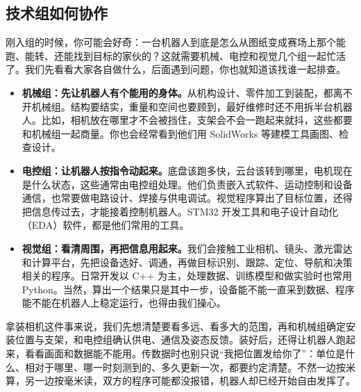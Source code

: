 \begingroup
\makeatletter
{}
\makeatother

\subsection*{技术组如何协作}
刚入组的时候，你可能会好奇：一台机器人到底是怎么从图纸变成赛场上那个能跑、能转、还能找到目标的家伙的？这就需要机械、电控和视觉几个组一起忙活了。我们先看看大家各自做什么，后面遇到问题，你也就知道该找谁一起排查。

\begin{itemize}
    \item \textbf{机械组：先让机器人有个能用的身体。}从机构设计、零件加工到装配，都离不开机械组。结构要结实，重量和空间也要顾到，最好维修时还不用拆半台机器人。比如，相机放在哪里才不会被挡住，支架会不会一跑起来就抖，这些都要和机械组一起商量。你也会经常看到他们用 SolidWorks 等建模工具画图、检查设计。
    \item \textbf{电控组：让机器人按指令动起来。}底盘该跑多快，云台该转到哪里，电机现在是什么状态，这些通常由电控组处理。他们负责嵌入式软件、运动控制和设备通信，也常要做电路设计、焊接与供电调试。视觉程序算出了目标位置，还得把信息传过去，才能接着控制机器人。STM32 开发工具和电子设计自动化（EDA）软件，都是他们常用的工具。
    \item \textbf{视觉组：看清周围，再把信息用起来。}我们会接触工业相机、镜头、激光雷达和计算平台，先把设备选好、调通，再做目标识别、跟踪、定位、导航和决策相关的程序。日常开发以 C++ 为主，处理数据、训练模型和做实验时也常用 Python。当然，算出一个结果只是其中一步，设备能不能一直采到数据、程序能不能在机器人上稳定运行，也得由我们操心。
\end{itemize}

拿装相机这件事来说，我们先想清楚要看多远、看多大的范围，再和机械组确定安装位置与支架，和电控组确认供电、通信及姿态反馈。装好后，还得让机器人跑起来，看看画面和数据能不能用。传数据时也别只说“我把位置发给你了”：单位是什么、相对于哪里、哪一时刻测到的、多久更新一次，都要约定清楚。不然一边按米算，另一边按毫米读，双方的程序可能都没报错，机器人却已经开始自由发挥了。

